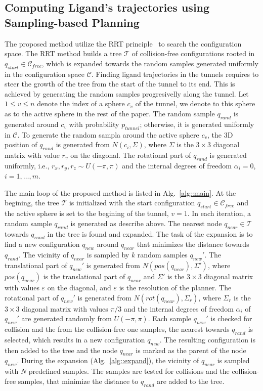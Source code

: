 \documentclass{bmcart}
\def\qrand{q_{rand}}
\def\qstart{q_{start}}
\def\qinit{\qstart}
\def\qnear{q_{near}}
\def\qnew{q_{new}}
\def\T{\mathcal{T}}
\def\C{\mathcal{C}}
\def\CF{\mathcal{C}_{free}}
\def\gb{p_{tunnel}}
\begin{document}
\subsection*{Computing Ligand's trajectories using Sampling-based Planning}

The proposed method utilize the RRT principle~\cite{lavalleRRT} to search the configuration space.
The RRT method builds a tree $\T$ of collision-free configurations rooted in $\qinit \in \CF$, which is expanded
towards the random samples generated uniformly in the configuration space $\C$.
Finding ligand trajectories in the tunnels requires to steer the growth of the tree from the start of the tunnel to its end.
This is achieved by generating the random samples progresivelly along the tunnel.
Let $1 \le v \le n$ denote the index of a sphere $c_v$ of the tunnel, we denote to this sphere as to the active sphere in the rest of the paper.
The random sample $\qrand$ is generated around  $c_v$ with probability $\gb$; otherwise, it is generated uniformly in $\C$.
To generate the random sampla around the active sphere $c_v$, the 3D position of $\qrand$ is generated from $N(c_i,\Sigma)$, where
$\Sigma$ is the $3\times 3$ diagonal matrix with value $r_v$ on the diagonal.
The rotational part of $\qrand$ is generated uniformly, i.e., $r_x,r_y,r_z \sim U(-\pi,\pi)$ and the internal degrees of 
freedom $\alpha_i=0$, $i=1,\ldots,m$.

The main loop of the proposed method is listed in Alg.~\ref{alg::main}.
At the begining, the tree $\T$ is initialized with the start configuration $\qinit \in \CF$ and the active sphere
is set to the begining of the tunnel, $v=1$.
In each iteration, a random sample $\qrand$ is generated as describe above.
The nearest node $\qnear \in \T$ towards $\qrand$  in the tree is found and expanded.
The task of the expansion is to find a new configuration $\qnew$ around $\qnear$ that minimizes the distance
towards $\qrand$.
The vicinity of $\qnear$ is sampled by $k$ random samples $\qnew'$. 
The translational part of $\qnew'$ is generated from $N(pos(\qnear),\Sigma')$, 
where $pos(\qnear)$ is the translational part of $\qnear$ and $\Sigma'$ is
the $3 \times 3$ diagonal matrix with values $\varepsilon$ on the diagonal, and $\varepsilon$ is the resolution of the planner.
The rotational part of $\qnew'$ is generated from $N(rot(\qnear), \Sigma_r)$, where $\Sigma_r$ is the $3 \times 3$ diagonal
matrix with values $\pi/3$ and the internal degrees of freedom $\alpha_i$ of $\qnew'$ are generated
randomly from $U(-\pi,\pi)$.
Each sample $\qnew'$ is checked for collision and the from the collision-free one samples, the nearest towards $\qrand$ is 
selected, which results in a new configuration $\qnew$.
The resulting configuration is then added to the tree and the node $\qnear$ is marked as the parent of the node $\qnew$.
During the expansion (Alg.~\ref{alg::expand}), the vicinity of $\qnear$ is sampled with $N$ predefined
samples.
The samples are tested for collisions and the collision-free samples, that minimize the distance to $\qrand$ are added to the tree.
\end{document}
